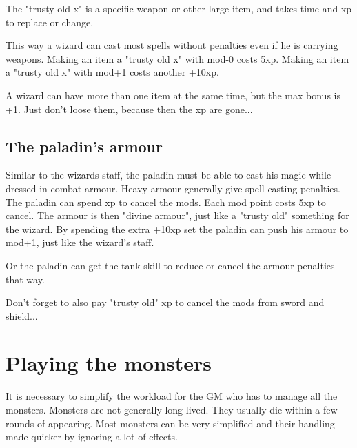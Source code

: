 The "trusty old x" is a specific weapon or other large item, and takes time and xp to replace or change.

This way a wizard can cast most spells without penalties even if he is carrying weapons. Making an item a "trusty old x" with mod-0 costs 5xp. Making an item a "trusty old x" with mod+1 costs another +10xp.

A wizard can have more than one item at the same time, but the max bonus is +1. Just don't loose them, because then the xp are gone...


\subsection*{The paladin's armour}
Similar to the wizards staff, the paladin must be able to cast his magic while dressed in combat armour. Heavy armour generally give spell casting penalties. The paladin can spend xp to cancel the mods. Each mod point costs 5xp to cancel. The armour is then "divine armour", just like a "trusty old" something for the wizard. By spending the extra +10xp set the paladin can push his armour to mod+1, just like the wizard's staff.

Or the paladin can get the tank skill to reduce or cancel the armour penalties that way.

Don't forget to also pay "trusty old" xp to cancel the mods from sword and shield...


















\section*{Playing the monsters}
It is necessary to simplify the workload for the GM who has to manage all the monsters. Monsters are not generally long lived. They usually die within a few rounds of appearing. Most monsters can be very simplified and their handling made quicker by ignoring a lot of effects.


